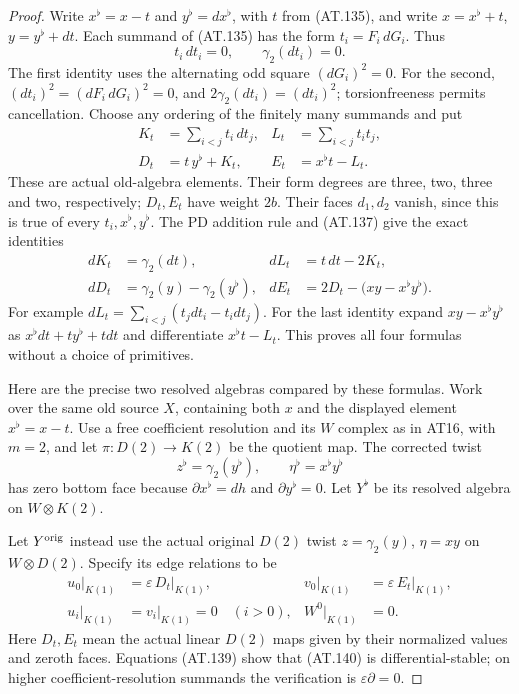 \begin{proof}
Write $x^\flat=x-t$ and $y^\flat=dx^\flat$, with $t$ from
(AT.135), and write $x=x^\flat+t$, $y=y^\flat+dt$.
Each summand of (AT.135) has the form $t_i=F_i\,dG_i$.
Thus
\[
                  t_i\,dt_i=0,\qquad \gamma_2(dt_i)=0.
 \tag{AT.137}
\]
The first identity uses the alternating odd square $(dG_i)^2=0$.
For the second, $(dt_i)^2=(dF_i\,dG_i)^2=0$, and
$2\gamma_2(dt_i)=(dt_i)^2$; torsionfreeness permits cancellation.
Choose any ordering of the finitely many summands and put
\[
 \begin{aligned}
 K_t&=\sum_{i<j}t_i\,dt_j,&
 L_t&=\sum_{i<j}t_it_j,\\
 D_t&=t\,y^\flat+K_t,&
 E_t&=x^\flat t-L_t .
 \end{aligned}                                                     \tag{AT.138}
\]
These are actual old-algebra elements. Their form degrees are
three, two, three and two, respectively; $D_t,E_t$ have weight
$2b$. Their faces $d_1,d_2$ vanish, since this is true of every
$t_i,x^\flat,y^\flat$.
The PD addition rule and (AT.137) give the exact identities
\[
 \begin{aligned}
 dK_t&=\gamma_2(dt),&
 dL_t&=t\,dt-2K_t,\\
 dD_t&=\gamma_2(y)-\gamma_2(y^\flat),&
 dE_t&=2D_t-\bigl(xy-x^\flat y^\flat\bigr).
 \end{aligned}                                                     \tag{AT.139}
\]
For example $dL_t=\sum_{i<j}(t_jdt_i-t_idt_j)$.
For the last identity expand $xy-x^\flat y^\flat$
as $x^\flat dt+t y^\flat+t dt$ and differentiate
$x^\flat t-L_t$. This proves all four formulas without
a choice of primitives.

Here are the precise two resolved algebras compared by
these formulas. Work over the same old source $X$, containing
both $x$ and the displayed element $x^\flat=x-t$.
Use a free coefficient resolution and its $W$ complex as in
AT16, with $m=2$, and let
$\pi:D(2)\to K(2)$ be the quotient map.
The corrected twist
\[
        z^\flat=\gamma_2(y^\flat),\qquad
        \eta^\flat=x^\flat y^\flat
\]
has zero bottom face because $\partial x^\flat=dh$ and
$\partial y^\flat=0$.
Let $Y^\flat$ be its resolved algebra on $W\otimes K(2)$.

Let $Y^{\rm orig}$ instead use the actual original
$D(2)$ twist $z=\gamma_2(y)$, $\eta=xy$ on $W\otimes D(2)$.
Specify its edge relations to be
\[
 \begin{aligned}
 u_0|_{K(1)}&=\varepsilon\,D_t|_{K(1)},&
 v_0|_{K(1)}&=\varepsilon\,E_t|_{K(1)},\\
 u_i|_{K(1)}&=v_i|_{K(1)}=0\quad(i>0),&
 W^0|_{K(1)}&=0 .
 \end{aligned}                                                     \tag{AT.140}
\]
Here $D_t,E_t$ mean the actual linear $D(2)$ maps given
by their normalized values and zeroth faces.
Equations (AT.139) show that (AT.140) is differential-stable;
on higher coefficient-resolution summands the verification
is $\varepsilon\partial=0$.


\end{proof}
